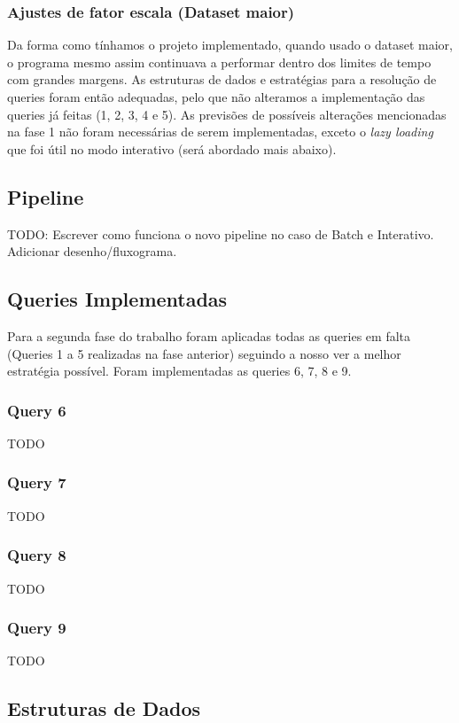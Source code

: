 \documentclass{article}
\begin{document}
        \subsubsection{Ajustes de fator escala (Dataset maior)}
            Da forma como tínhamos o projeto implementado, quando 
            usado o dataset maior, o programa mesmo assim continuava
            a performar dentro dos limites de tempo com grandes 
            margens. As estruturas de dados e estratégias para
            a resolução de queries foram então adequadas, pelo que
            não alteramos a implementação das queries já feitas
            (1, 2, 3, 4 e 5). As previsões de possíveis alterações
            mencionadas na fase 1 não foram necessárias de serem
            implementadas, exceto o \emph{lazy loading} que foi
            útil no modo interativo (será abordado mais abaixo).
        
    \subsection{Pipeline}
        TODO: Escrever como funciona o novo pipeline no caso de Batch e Interativo.
        Adicionar desenho/fluxograma.
    \subsection{Queries Implementadas}
        Para a segunda fase do trabalho foram aplicadas todas as queries em falta
        (Queries 1 a 5 realizadas na fase anterior) seguindo a nosso ver a melhor
        estratégia possível. Foram implementadas as queries 6, 7, 8 e 9.
        \subsubsection{Query 6}
            TODO
        \subsubsection{Query 7}
            TODO
        \subsubsection{Query 8}
            TODO
        \subsubsection{Query 9}
            TODO
    \subsection{Estruturas de Dados}
\end{document}
